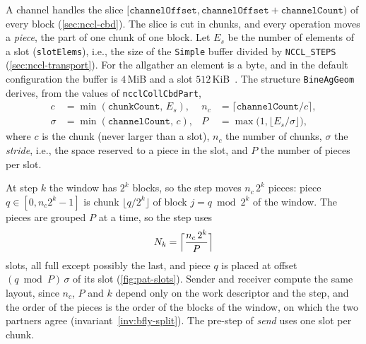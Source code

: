 A channel handles the slice $[\texttt{channelOffset},\texttt{channelOffset}+\texttt{channelCount})$ of every block (\cref{sec:nccl-cbd}).
The slice is cut in chunks, and every operation moves a \emph{piece}, the part of one chunk of one block.
Let $E_s$ be the number of elements of a slot (\texttt{slotElems}), i.e., the size of the \texttt{Simple} buffer divided by \texttt{NCCL\_STEPS} (\cref{sec:nccl-transport}).
For the allgather an element is a byte, and in the default configuration the buffer is $4$\,MiB and a slot $512$\,KiB~\cite{hu2025demystifying}.
The structure \texttt{BineAgGeom} derives, from the values of \texttt{ncclCollCbdPart},
\begin{align}
  c &= \min(\texttt{chunkCount},\,E_s), & n_c &= \lceil \texttt{channelCount}/c\rceil,\\
  \sigma &= \min(\texttt{channelCount},\,c), & P &= \max\bigl(1,\lfloor E_s/\sigma\rfloor\bigr),
\end{align}
where $c$ is the chunk (never larger than a slot), $n_c$ the number of chunks, $\sigma$ the \emph{stride}, i.e., the space reserved to a piece in the slot, and $P$ the number of pieces per slot.

At step $k$ the window has $2^k$ blocks, so the step moves $n_c\,2^k$ pieces: piece $q\in[0,n_c2^k-1]$ is chunk $\lfloor q/2^k\rfloor$ of block $j=q\bmod 2^k$ of the window.
The pieces are grouped $P$ at a time, so the step uses
\begin{equation}
  N_k=\Bigl\lceil \frac{n_c\,2^k}{P}\Bigr\rceil
  \label{eq:pat-slots}
\end{equation}
slots, all full except possibly the last, and piece $q$ is placed at offset $(q\bmod P)\,\sigma$ of its slot (\cref{fig:pat-slots}).
Sender and receiver compute the same layout, since $n_c$, $P$ and $k$ depend only on the work descriptor and the step, and the order of the pieces is the order of the blocks of the window, on which the two partners agree (invariant~\ref{inv:bfly-split}).
The pre-step of \emph{send} uses one slot per chunk.

